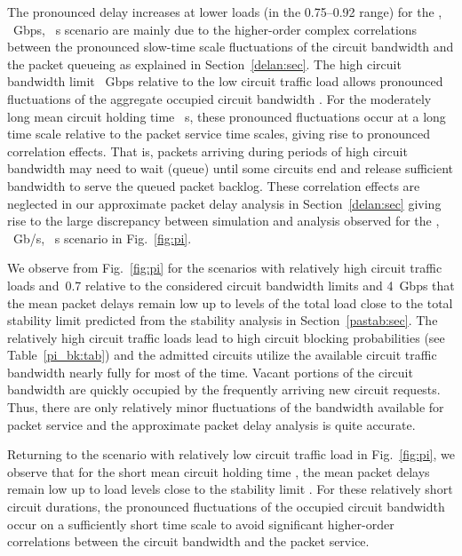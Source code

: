 \documentclass[article]{IEEEtran}
\begin{document}
The pronounced delay increases at lower loads (in the 0.75--0.92
range) for the , ~Gbps, ~s
scenario are mainly due to the higher-order complex correlations
between the pronounced slow-time scale fluctuations of the
circuit bandwidth and the packet queueing
as explained in Section~\ref{delan:sec}.
The high circuit bandwidth limit ~Gbps relative to the
low circuit traffic load  allows
pronounced fluctuations of the aggregate occupied circuit bandwidth
. For the moderately long mean circuit holding time ~s, these pronounced fluctuations occur at a long time scale
relative to the packet service time scales, giving rise to
pronounced correlation effects. That is, packets arriving during
periods of high circuit bandwidth  may need to wait (queue)
until some circuits end and release sufficient bandwidth to serve
the queued packet backlog. These correlation effects are neglected
in our approximate packet delay analysis in Section~\ref{delan:sec}
giving rise to the large discrepancy between simulation and analysis
observed for the , ~Gb/s, ~s scenario in
Fig.~\ref{fig:pi}.

We observe from Fig.~\ref{fig:pi} for the scenarios with
relatively high circuit traffic loads  and~0.7
relative to the considered circuit bandwidth limits 
and 4~Gbps that the mean packet delays remain low up to
levels of the total load close to the total stability limit
 predicted from the stability analysis
in Section~\ref{pastab:sec}.
The relatively high circuit traffic loads 
lead to high circuit blocking probabilities
(see Table~\ref{pi_bk:tab}) and the admitted circuits utilize the
available circuit traffic bandwidth  nearly fully
for most of the time. Vacant portions of the
circuit bandwidth  are quickly occupied by the frequently arriving
new circuit requests. Thus, there are only relatively minor
fluctuations of the bandwidth available for packet service
and the approximate packet delay analysis is quite accurate.

Returning to the scenario with relatively low circuit traffic load
 in Fig.~\ref{fig:pi}, we observe that for
the short mean circuit holding time , the
mean packet delays remain low up to load levels close to the
stability limit .
For these relatively short circuit durations, the pronounced
fluctuations of the occupied circuit bandwidth occur on a sufficiently
short time scale to avoid significant higher-order correlations between
the circuit bandwidth and the packet service.
\end{document}
